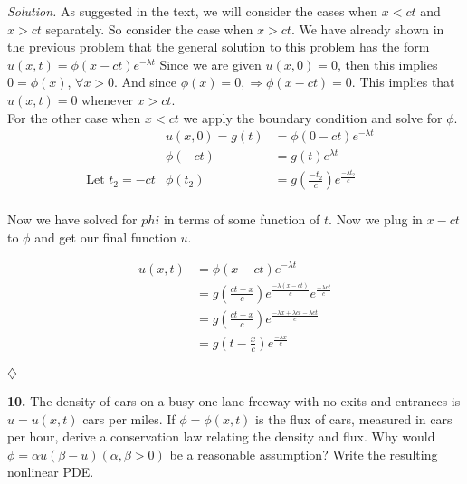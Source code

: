 \documentclass{article}
\begin{document}
\vspace{2mm}



\noindent
\textit{Solution.} As suggested in the text, we will consider the cases when \( x<ct \) and \( x>ct \) separately. So consider the case when \( x>ct\). We have already shown in the previous problem that the general solution to this problem has the form \(u(x,t)= \phi(x-ct) e^{-\lambda t} \)   Since we are given \(u(x,0)=0\), then this implies \( 0 = \phi(x) \),  \(\forall x >0 \). And since \(\phi(x)=0, \Rightarrow \phi(x-ct) =0\). This implies that \(u(x,t)=0\) whenever \(x>ct\).   \\
\noindent
For the other case when \(x < ct\) we apply the boundary condition and solve for \(\phi\).
\begin{align*}
    &  &    u(x,0)=g(t)&=\phi(0-ct) e^{- \lambda t} &      &   \\
          &  &     \phi(-ct)&= g(t)e^{ \lambda t}    &    &   \\
          &   \text{Let \(t_2=-ct\)}    &    \phi(t_2)&=g(\frac{-t_2}{c})e^{\frac{-\lambda t_2}{c}  }    &    &   \\
\end{align*}

\noindent
Now we have solved for \(phi\) in terms of some function of \(t\). Now we plug in \(x-ct\) to \(\phi\) and get our final function \(u\). 

\begin{align*}
u(x,t) &=  \phi(x-ct)e^{-\lambda t}\\
&= g( \frac{ ct - x }{c} )e^{\frac{ -\lambda(x-ct)}{c}}  e^{ \frac{-\lambda ct}{c}} \\
&= g( \frac{ ct - x }{c} )e^{\frac{ -\lambda x + \lambda ct - \lambda ct}{c}}  \\
&= g(t - \frac{x}{c}) e^{\frac{-\lambda x}{c}}
\end{align*}
\begin{flushright}
\( \diamondsuit \) 
\end{flushright}

\newpage
\noindent
\textbf{10.} The density of cars on a busy one-lane freeway with no exits and entrances is \(u=u(x,t)\) cars per miles. If \(\phi = \phi(x,t)\) is the flux of cars, measured in cars per hour, derive a conservation law relating the density and flux. Why would \(\phi=\alpha u (\beta-u) (\alpha,\beta > 0)\) be a reasonable assumption? Write the resulting nonlinear PDE. 

\vspace{2mm}
\end{document}
